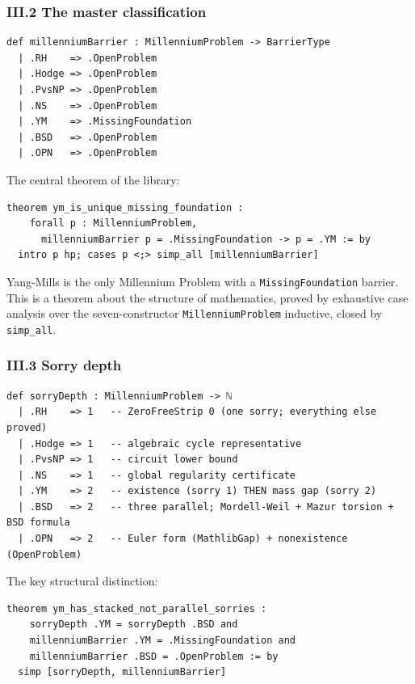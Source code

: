 \documentclass[12pt,a4paper]{article}
\begin{document}
\subsubsection{III.2 The master classification}

\begin{lstlisting}[language=lean]
def millenniumBarrier : MillenniumProblem -> BarrierType
  | .RH    => .OpenProblem
  | .Hodge => .OpenProblem
  | .PvsNP => .OpenProblem
  | .NS    => .OpenProblem
  | .YM    => .MissingFoundation
  | .BSD   => .OpenProblem
  | .OPN   => .OpenProblem
\end{lstlisting}

The central theorem of the library:

\begin{lstlisting}[language=lean]
theorem ym_is_unique_missing_foundation :
    forall p : MillenniumProblem,
      millenniumBarrier p = .MissingFoundation -> p = .YM := by
  intro p hp; cases p <;> simp_all [millenniumBarrier]
\end{lstlisting}

Yang-Mills is the only Millennium Problem with a \texttt{MissingFoundation} barrier. This is a theorem about the structure of mathematics, proved by exhaustive case analysis over the seven-constructor \texttt{MillenniumProblem} inductive, closed by \texttt{simp\_all}.

\subsubsection{III.3 Sorry depth}

\begin{lstlisting}[language=lean]
def sorryDepth : MillenniumProblem -> ℕ
  | .RH    => 1   -- ZeroFreeStrip 0 (one sorry; everything else proved)
  | .Hodge => 1   -- algebraic cycle representative
  | .PvsNP => 1   -- circuit lower bound
  | .NS    => 1   -- global regularity certificate
  | .YM    => 2   -- existence (sorry 1) THEN mass gap (sorry 2)
  | .BSD   => 2   -- three parallel; Mordell-Weil + Mazur torsion + BSD formula
  | .OPN   => 2   -- Euler form (MathlibGap) + nonexistence (OpenProblem)
\end{lstlisting}

The key structural distinction:

\begin{lstlisting}[language=lean]
theorem ym_has_stacked_not_parallel_sorries :
    sorryDepth .YM = sorryDepth .BSD and
    millenniumBarrier .YM = .MissingFoundation and
    millenniumBarrier .BSD = .OpenProblem := by
  simp [sorryDepth, millenniumBarrier]
\end{lstlisting}
\end{document}
